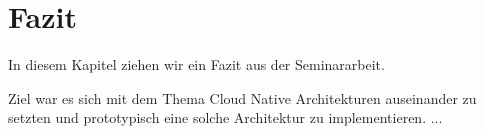 \chapter{Fazit}

In diesem Kapitel ziehen wir ein Fazit aus der Seminararbeit.

Ziel war es sich mit dem Thema Cloud Native Architekturen auseinander zu setzten und prototypisch eine solche Architektur zu implementieren. ...\\
\\